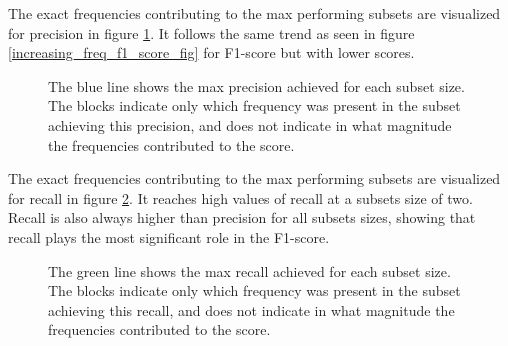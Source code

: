     The exact frequencies contributing to the max performing subsets are visualized for precision in figure \ref{increasing_freq_precision_score_fig}. It follows the same trend as seen in figure \ref{increasing_freq_f1_score_fig} for F1-score but with lower scores.

        \begin{figure}[H] 
            \centering
            
            \caption[Best frequency combination - Precision]{The blue line shows the max precision achieved for each subset size. The blocks indicate only which frequency was present in the subset achieving this precision, and does not indicate in what magnitude the frequencies contributed to the score.}
          	\medskip 
            \label{increasing_freq_precision_score_fig}
        \end{figure}
        
    The exact frequencies contributing to the max performing subsets are visualized for recall in figure \ref{increasing_freq_recall_score_fig}. It reaches high values of recall at a subsets size of two. Recall is also always higher than precision for all subsets sizes, showing that recall plays the most significant role in the F1-score.
    
    
        \begin{figure}[H] 
            \centering
            
            \caption[Best frequency combination - Recall]{The green line shows the max recall achieved for each subset size. The blocks indicate only which frequency was present in the subset achieving this recall, and does not indicate in what magnitude the frequencies contributed to the score.}
          	\medskip 
            \label{increasing_freq_recall_score_fig}
        \end{figure}

